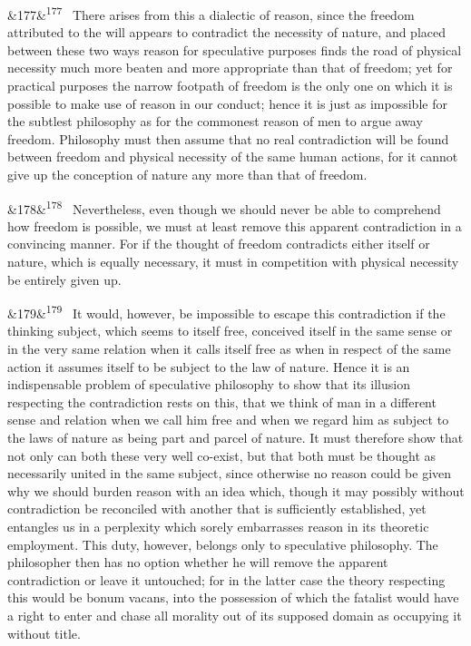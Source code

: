 \documentclass[12pt]{article}
\newcommand{\para}[1][]{\par\noindent\ifx&#1&\else\textsuperscript{\footnotesize #1}~\fi}
\begin{document}
\para[177] There arises from this a dialectic of reason, since the freedom attributed to the will appears to contradict the necessity of nature, and placed between these two ways reason for speculative purposes finds the road of physical necessity much more beaten and more appropriate than that of freedom; yet for practical purposes the narrow footpath of freedom is the only one on which it is possible to make use of reason in our conduct; hence it is just as impossible for the subtlest philosophy as for the commonest reason of men to argue away freedom. Philosophy must then assume that no real contradiction will be found between freedom and physical necessity of the same human actions, for it cannot give up the conception of nature any more than that of freedom.

\para[178] Nevertheless, even though we should never be able to comprehend how freedom is possible, we must at least remove this apparent contradiction in a convincing manner. For if the thought of freedom contradicts either itself or nature, which is equally necessary, it must in competition with physical necessity be entirely given up.

\para[179] It would, however, be impossible to escape this contradiction if the thinking subject, which seems to itself free, conceived itself in the same sense or in the very same relation when it calls itself free as when in respect of the same action it assumes itself to be subject to the law of nature. Hence it is an indispensable problem of speculative philosophy to show that its illusion respecting the contradiction rests on this, that we think of man in a different sense and relation when we call him free and when we regard him as subject to the laws of nature as being part and parcel of nature. It must therefore show that not only can both these very well co-exist, but that both must be thought as necessarily united in the same subject, since otherwise no reason could be given why we should burden reason with an idea which, though it may possibly without contradiction be reconciled with another that is sufficiently established, yet entangles us in a perplexity which sorely embarrasses reason in its theoretic employment. This duty, however, belongs only to speculative philosophy. The philosopher then has no option whether he will remove the apparent contradiction or leave it untouched; for in the latter case the theory respecting this would be bonum vacans, into the possession of which the fatalist would have a right to enter and chase all morality out of its supposed domain as occupying it without title.
\end{document}

